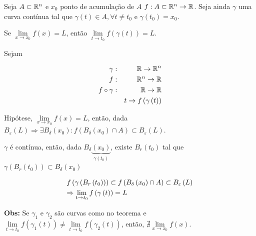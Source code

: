 \documentclass{book}
\begin{document}
\begin{teo}
    Seja $A \subset \mathbb{R}^n$ e $x_0$ ponto de acumula\c c\~ao de $A$ $f:A \subset \mathbb{R}^n  \to \mathbb{R}$. Seja ainda $\gamma$ uma curva cont\'inua tal que $\gamma \left( t \right) \in A,\forall t \ne t_0$ e $\gamma \left( {t_0 } \right) = x_0$.

    Se $\mathop {\lim }\limits_{x \to x_0 } f\left( x \right) = L$, ent\~ao $\mathop {\lim }\limits_{t \to t_0 } f\left( {\gamma \left( t \right)} \right) = L$.
\end{teo}

\begin{dem}
Sejam

\begin{eqnarray*}
\gamma &:&\R \to \R^n  \hfill \\
f&:&\R^n  \to \R \hfill \\
f \circ \gamma &:&\R \to \R \hfill \\
&& t \to f\left( {\gamma \left( t \right)} \right) \hfill \\
\end{eqnarray*}

    Hip\'otese, $\mathop {\lim }\limits_{x \to x_0 } f\left( x \right) = L$, ent\~ao, dada $B_\varepsilon  \left( L \right) \Rightarrow \exists B_\delta  \left( {x_0 } \right):f\left( {B_\delta  \left( {x_0 } \right) \cap A} \right) \subset B_\varepsilon  \left( L \right)$.


    $\gamma$ \'e cont\'inua, ent\~ao, dada $B_\delta  \underbrace {\left( {x_0 } \right)}_{\gamma \left( {t_0 } \right)}$, existe $B_r \left( {t_0 } \right)$ tal que $\gamma \left( {B_r \left( {t_0 } \right)} \right) \subset B_\delta  \left( {x_0 } \right)$

\[
\begin{gathered}
  f\left( {\gamma \left( {B_r \left( {t_0 } \right)} \right)} \right) \subset f\left( {B_\delta  \left( {x_0 } \right) \cap A} \right) \subset B_\varepsilon  \left( L \right) \hfill \\
   \Rightarrow \mathop {\lim }\limits_{t \to t_0 } f\left( {\gamma \left( t \right)} \right) = L \hfill \\
\end{gathered}
\]

\end{dem}

\textbf{Obs:} Se $\gamma_1$ e $\gamma_2$ s\~ao curvas como no teorema e $\mathop {\lim }\limits_{t \to t_0 } f\left( {\gamma _1 \left( t \right)} \right) \ne \mathop {\lim }\limits_{t \to t_0 } f\left( {\gamma _2 \left( t \right)} \right)$, ent\~ao, $\nexists \mathop {\lim }\limits_{x \to x_0 } f\left( x \right)$.
\end{document}
